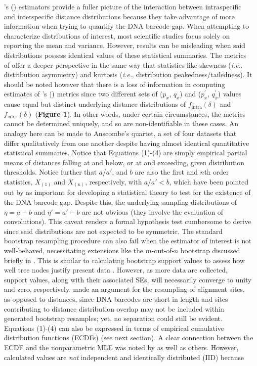 \documentclass[12pt]{article}
\begin{document}
\citeauthor{phillips2024measure}'s (\citeyear{phillips2024measure}) estimators provide a fuller picture of the interaction between intraspecific and interspecific distance distributions because they take advantage of more information when trying to quantify the DNA barcode gap. When attempting to characterize distributions of interest, most scientific studies focus solely on reporting the mean and variance. However, results can be misleading when said distributions possess identical values of these statistical summaries. The metrics of \citet{phillips2024measure} offer a deeper perspective in the same way that statistics like skewness (\textit{i.e.}, distribution asymmetry) and kurtosis (\textit{i.e.}, distribution peakedness/tailedness). It should be noted however that there is a loss of information in computing estimates of \citeauthor{phillips2024measure}'s (\citeyear{phillips2024measure}) metrics since two different sets of ($p_x$, $q_x$) and ($p^{'}_x$, $q^{'}_x$) values cause equal but distinct underlying distance distributions of $f_{\mathrm{intra}}(\delta)$ and $f_{\mathrm{inter}}(\delta)$ (\textbf{Figure 1}). In other words, under certain circumstances, the metrics cannot be determined uniquely, and so are non-identifiable in these cases. An analogy here can be made to Anscombe's quartet, a set of four datasets that differ qualitatively from one another despite having almost identical quantitative statistical summaries.  Notice that Equations (1)-(4) are simply empirical partial means of distances falling at and below, or at and exceeding, given distribution thresholds. Notice further that $a$/$a'$, and $b$ are also the first and $n$th order statistics, $X_{(1)}$ and $X_{(n)}$, respectively, with  $a$/$a' < b$,  which have been pointed out by \citet{phillips2022lack} as important for developing a statistical theory to test for the existence of the DNA barcode gap. Despite this, the underlying sampling distributions of $\eta = a - b$ and $\eta' = a' - b$ are not obvious (they involve the evaluation of convolutions). This caveat renders a formal hypothesis test cumbersome to derive since said distributions are not expected to be symmetric. The standard bootstrap resampling procedure can also fail when the estimator of interest is not well-behaved, necessitating extensions like the $m$-out-of-$n$ bootstrap discussed briefly in \citet{phillips2022lack}. This is similar to calculating bootstrap support values to assess how well tree nodes justify present data \citep{efron1996bootstrap}. However, as more data are collected, support values, along with their associated SEs, will necessarily converge to unity and zero, respectively. \citet{phillips2024measure} made an argument for the resampling of alignment sites, as opposed to distances, since DNA barcodes are short in length and sites contributing to distance distribution overlap may not be included within generated bootstrap resamples; yet, no separation could still be evident. Equations (1)-(4) can also be expressed in terms of empirical cumulative distribution functions (ECDFs) (see next section). A clear connection between the ECDF and the nonparametric MLE was noted by \citet{efron1993introduction} as well as others. However, calculated values are \textit{not} independent and identically distributed (IID) because 
\end{document}
